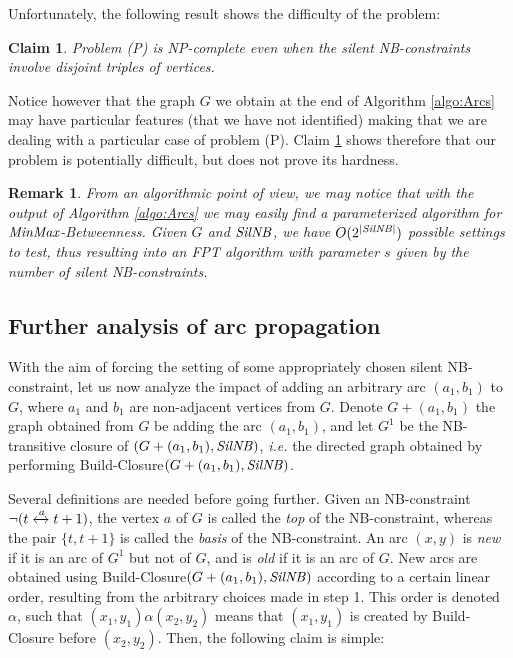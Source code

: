 \documentclass{article}
\newcommand{\M}{\mbox{\it MinMax}}
\newcommand{\lrf}[1]{\xleftrightarrow{#1}}
\newcommand{\Sil}{{\it SilNB}}
\newtheorem{fait}{Claim}
\newtheorem{rmk}{Remark}
\newcommand{\br}{\begin{rmk}\rm}
\newcommand{\er}{\end{rmk}}
\newcommand{\bfn}{\begin{fait}}
\newcommand{\efn}{\end{fait}}
\begin{document}
Unfortunately, the following result shows the difficulty of the problem:

\bfn \cite{guttmann2006variations}
Problem (P) is NP-complete even when the silent NB-constraints involve disjoint triples of vertices.
\label{claim:NPc}
\efn

Notice however that the graph $G$ we obtain at the end of Algorithm \ref{algo:Arcs} may have particular 
features (that we have not identified) making that we are dealing
with a particular case of problem (P). Claim \ref{claim:NPc} shows therefore that our problem is
potentially difficult, but does not prove its hardness.
 


\br
From an algorithmic point of view, we may notice that with the output of Algorithm \ref{algo:Arcs}
we may easily find a parameterized algorithm for $\M$-{\sc Betweenness}. Given $G$ and $\Sil$,
we have $O(2^{|\Sil|})$ possible settings to test, thus resulting into 
an FPT algorithm with parameter $s$ given by the number of silent NB-constraints. 
\er

\subsection{Further analysis of arc propagation}

With the aim of forcing the setting of some appropriately chosen silent NB-constraint,  
let us now analyze the impact of adding an arbitrary arc $(a_1,b_1)$ to $G$, where  
$a_1$ and $b_1$  are non-adjacent vertices from $G$. Denote $G+(a_1,b_1)$  the graph 
obtained from $G$ be adding the arc $(a_1,b_1)$, and  let $G^1$ be the NB-transitive closure of 
$(G+(a_1,b_1), \Sil)$,  {\em i.e.} the directed graph obtained by performing 
Build-Closure$(G+(a_1,b_1), \Sil)$. 

Several definitions are needed before going further. Given an NB-constraint  $\neg(t\lrf{a}t+1)$, the vertex
$a$ of $G$ is called the {\em top} of the NB-constraint, whereas the pair $\{t,t+1\}$  is called
the {\em basis} of the NB-constraint. An arc $(x,y)$ is {\em new} if it is an arc of $G^1$ but
not of $G$, and is {\em old} if it is an arc of $G$. New arcs are obtained using 
Build-Closure$(G+(a_1,b_1), \Sil)$ according to a certain linear order, resulting from the arbitrary choices made in step 1. This order is denoted $\alpha$, such that $(x_1,y_1)\alpha
(x_2,y_2)$ means that $(x_1,y_1)$ is created by Build-Closure before $(x_2,y_2)$.
Then, the following claim is simple:
\end{document}
